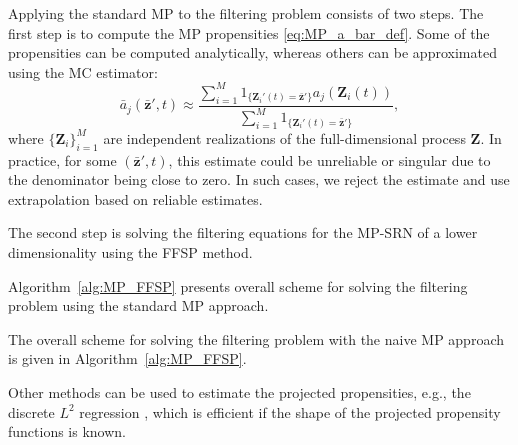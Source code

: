 Applying the standard \ac{MP} to the filtering problem consists of two steps. The first step is to compute the \ac{MP} propensities \eqref{eq:MP_a_bar_def}. Some of the propensities can be computed analytically, whereas others can be approximated using the \ac{MC} estimator:
\begin{equation}
\label{eq:a_bar_est}
    \bar{a}_j (\bar{\boldsymbol{z}}', t) \approx \frac{\sum\limits_{i=1}^{M} 1_{\{ {\boldsymbol{Z}}_i'(t) = \bar{\boldsymbol{z}}' \}} a_j({\boldsymbol{Z}}_i(t)) }{ \sum\limits_{i=1}^{M} 1_{\{ {\boldsymbol{Z}}_i'(t) = \bar{\boldsymbol{z}}' \}} },
\end{equation}
where $\{ \boldsymbol{Z}_i \}_{i=1}^{M}$ are independent realizations of the full-dimensional process $\boldsymbol{Z}$. In practice, for some $(\bar{\boldsymbol{z}}', t)$, this estimate could be unreliable or singular due to the denominator being close to zero. In such cases, we reject the estimate and use extrapolation based on reliable estimates. 

The second step is solving the filtering equations for the \ac{MP}-\ac{SRN} of a lower dimensionality using the \ac{FFSP} method. 

Algorithm~\ref{alg:MP_FFSP} presents overall scheme for solving the filtering problem using the standard \ac{MP} approach.

The overall scheme for solving the filtering problem with the naive \ac{MP} approach is given in Algorithm~\ref{alg:MP_FFSP}.


\begin{remark}
    Other methods can be used to estimate the projected propensities, e.g., the discrete $L^2$ regression \cite[Section~3.2]{Hammouda2023MP}, which is efficient if the shape of the projected propensity functions is known.
\end{remark}

